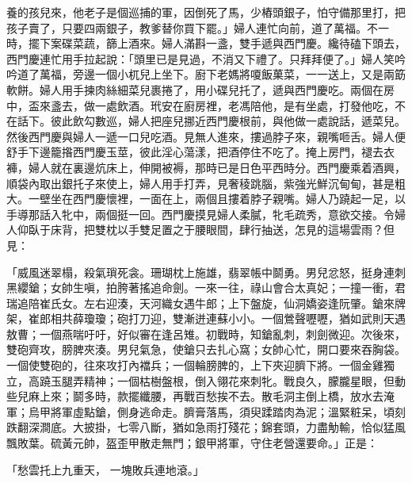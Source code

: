養的孩兒來，他老子是個巡捕的軍，因倒死了馬，少樁頭銀子，怕守備那里打，把孩子賣了，只要四兩銀子，教爹替你買下罷。」婦人連忙向前，道了萬福。不一時，擺下案碟菜蔬，篩上酒來。婦人滿斟一盞，雙手遞與西門慶。纔待磕下頭去，西門慶連忙用手拉起說：「頭里已是見過，不消又下禮了。只拜拜便了。」婦人笑吟吟道了萬福，旁邊一個小杌兒上坐下。廚下老媽將嗄飯菓菜，一一送上，又是兩筯軟餅。婦人用手揀肉絲細菜兒裹捲了，用小碟兒托了，遞與西門慶吃。兩個在房中，盃來盞去，做一處飲酒。玳安在廚房裡，老馮陪他，是有坐處，打發他吃，不在話下。彼此飲勾數巡，婦人把座兒挪近西門慶根前，與他做一處說話，遞菜兒。然後西門慶與婦人一遞一口兒吃酒。見無人進來，摟過脖子來，親嘴咂舌。婦人便舒手下邊籠揝西門慶玉莖，彼此淫心蕩漾，把酒停住不吃了。掩上房門，褪去衣褲，婦人就在裏邊炕床上，伸開被褥，那時已是日色平西時分。西門慶乘着酒興，順袋內取出銀托子來使上，婦人用手打弄，見奢稜跳腦，紫強光鮮沉甸甸，甚是粗大。一壁坐在西門慶懷裡，一面在上，兩個且摟着脖子親嘴。婦人乃蹺起一足，以手導那話入牝中，兩個挺一回。西門慶摸見婦人柔膩，牝毛疏秀，意欲交接。令婦人仰臥于床背，把雙枕以手雙足置之于腰眼間，肆行抽送，怎見的這場雲雨？但見：

「威風迷翠榻，殺氣瑣死衾。珊瑚枕上施雄，翡翠帳中鬬勇。男兒忿怒，挺身連刺黑纓鎗；女帥生嗔，拍胯著搖追命劍。一來一往，祿山會合太真妃；一撞一衝，君瑞追陪崔氏女。左右迎湊，天河織女遇牛郎；上下盤旋，仙洞嬌姿逢阮肇。鎗來牌架，崔郎相共薛瓊瓊；砲打刀迎，雙漸迸連蘇小小。一個鶯聲嚦嚦，猶如武則天遇敖曹；一個燕喘吁吁，好似審在逢呂雉。初戰時，知鎗亂刺，刺劍微迎。次後來，雙砲齊攻，膀脾夾湊。男兒氣急，使鎗只去扎心窩；女帥心忙，開口要來吞胸袋。一個使雙砲的，往來攻打內襠兵；一個輪膀脾的，上下夾迎臍下將。一個金雞獨立，高蹺玉腿弄精神；一個枯樹盤根，倒入翎花來刺牝。戰良久，朦朧星眼，但動些兒麻上來；鬬多時，款擺纖腰，再戰百愁挨不去。散毛洞主倒上橋，放水去淹軍；烏甲將軍虛點鎗，側身逃命走。臍膏落馬，須臾蹂踏肉為泥；溫緊粧呆，頃刻跌翻深澗底。大披掛，七零八斷，猶如急雨打殘花；錦套頭，力盡觔輸，恰似猛風飄敗葉。硫黃元帥，盔歪甲散走無門；銀甲將軍，守住老營還要命。」正是：

「愁雲托上九重天，  一塊敗兵連地滾。」

